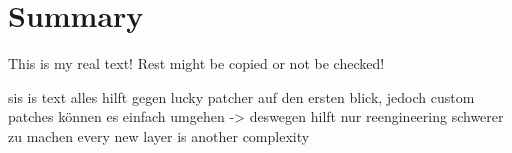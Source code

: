 \section{Summary}\label{section:conclusion-summary}
This is my real text! Rest might be copied or not be checked!


sis is text
alles hilft gegen lucky patcher auf den ersten blick, jedoch custom patches können es einfach umgehen -> deswegen hilft nur reengineering schwerer zu machen\newline
every new layer is another complexity\newline
